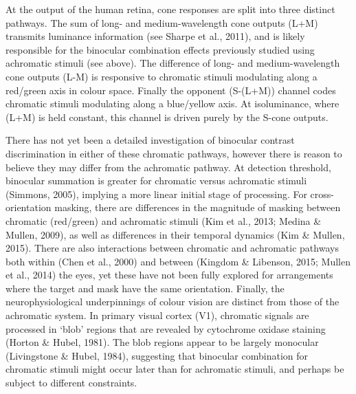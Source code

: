 \documentclass[
  letterpaper,
  DIV=11,
  numbers=noendperiod]{scrartcl}
\begin{document}
At the output of the human retina, cone responses are split into three
distinct pathways. The sum of long- and medium-wavelength cone outputs
(L+M) transmits luminance information (see Sharpe et al., 2011), and is
likely responsible for the binocular combination effects previously
studied using achromatic stimuli (see above). The difference of long-
and medium-wavelength cone outputs (L-M) is responsive to chromatic
stimuli modulating along a red/green axis in colour space. Finally the
opponent (S-(L+M)) channel codes chromatic stimuli modulating along a
blue/yellow axis. At isoluminance, where (L+M) is held constant, this
channel is driven purely by the S-cone outputs.

There has not yet been a detailed investigation of binocular contrast
discrimination in either of these chromatic pathways, however there is
reason to believe they may differ from the achromatic pathway. At
detection threshold, binocular summation is greater for chromatic versus
achromatic stimuli (Simmons, 2005), implying a more linear initial stage
of processing. For cross-orientation masking, there are differences in
the magnitude of masking between chromatic (red/green) and achromatic
stimuli (Kim et al., 2013; Medina \& Mullen, 2009), as well as
differences in their temporal dynamics (Kim \& Mullen, 2015). There are
also interactions between chromatic and achromatic pathways both within
(Chen et al., 2000) and between (Kingdom \& Libenson, 2015; Mullen et
al., 2014) the eyes, yet these have not been fully explored for
arrangements where the target and mask have the same orientation.
Finally, the neurophysiological underpinnings of colour vision are
distinct from those of the achromatic system. In primary visual cortex
(V1), chromatic signals are processed in `blob' regions that are
revealed by cytochrome oxidase staining (Horton \& Hubel, 1981). The
blob regions appear to be largely monocular (Livingstone \& Hubel,
1984), suggesting that binocular combination for chromatic stimuli might
occur later than for achromatic stimuli, and perhaps be subject to
different constraints.
\end{document}
